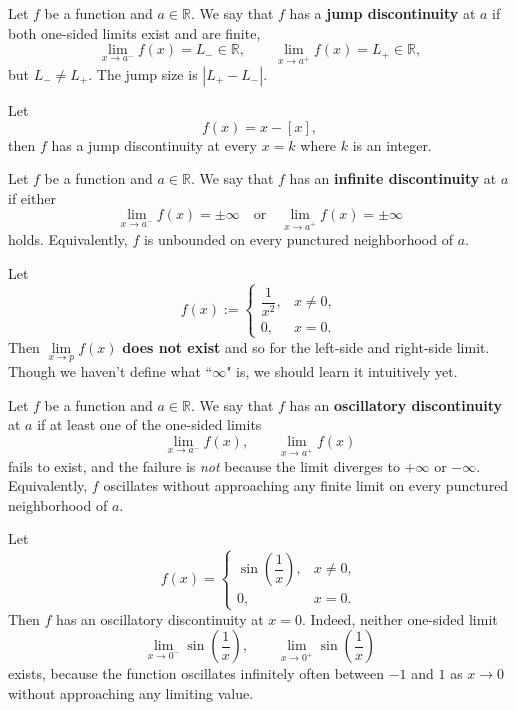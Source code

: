 	\begin{definitionenv}
		Let $f$ be a function and $a\in\mathbb{R}$. We say that $f$ has a \textbf{jump discontinuity} at $a$ if both one-sided limits exist and are finite,
		\[
		\lim_{x\to a^-} f(x)=L_- \in \mathbb{R},\qquad
		\lim_{x\to a^+} f(x)=L_+ \in \mathbb{R},
		\]
		but $L_- \neq L_+$. The jump size is $|L_+-L_-|$.
	\end{definitionenv}
	
	\begin{exampleenv}
		Let
		\[
		f(x)=x-\left[ x\right],
		\]
		then $f$ has a jump discontinuity at every $x=k$ where $k$ is an integer.
	\end{exampleenv}
	
	\begin{definitionenv}
		Let $f$ be a function and $a\in\mathbb{R}$. We say that $f$ has an \textbf{infinite discontinuity} at $a$ if either
		\[
		\lim_{x\to a^-} f(x)=\pm\infty \quad \text{or} \quad
		\lim_{x\to a^+} f(x)=\pm\infty
		\]
		holds. Equivalently, $f$ is unbounded on every punctured neighborhood of $a$.
	\end{definitionenv}
	
	\begin{exampleenv}
		Let
		\[
		f(x):=
		\begin{cases}
			\dfrac{1}{x^2}, & x \neq 0,\\[6pt]
			0,  & x = 0.
		\end{cases}
		\]
		Then $\lim\limits_{x\to p}f(x)$ \textbf{does not exist} and so for the left-side and right-side limit. Though we haven't define what ``$\infty$" is, we should learn it intuitively yet.
	\end{exampleenv}

	\begin{definitionenv}
		Let $f$ be a function and $a\in\mathbb{R}$. 
		We say that $f$ has an \textbf{oscillatory discontinuity} at $a$ if at least one of the one-sided limits
		\[
		\lim_{x\to a^-} f(x), \qquad \lim_{x\to a^+} f(x)
		\]
		fails to exist, and the failure is \emph{not} because the limit diverges to 
		$+\infty$ or $-\infty$. Equivalently, $f$ oscillates without approaching any 
		finite limit on every punctured neighborhood of $a$.
	\end{definitionenv}

	\begin{exampleenv}
		Let 
		\[
		f(x)=
		\begin{cases}
			\sin\left(\dfrac{1}{x}\right), & x\neq 0,\\[4pt]
			0, & x=0.
		\end{cases}
		\]
		Then $f$ has an oscillatory discontinuity at $x=0$. Indeed,
		neither one-sided limit 
		\[
		\lim_{x\to0^-}\sin\left(\dfrac{1}{x}\right), \qquad 
		\lim_{x\to0^+}\sin\left(\dfrac{1}{x}\right)
		\]
		exists, because the function oscillates infinitely often between $-1$ and $1$
		as $x\to 0$ without approaching any limiting value.
	\end{exampleenv}

